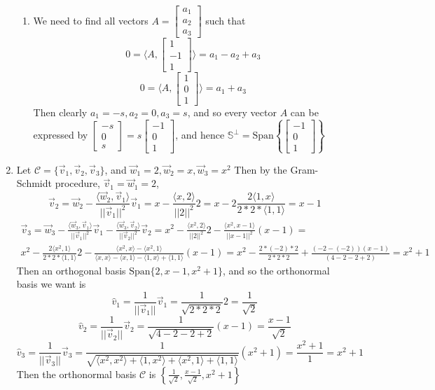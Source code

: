 \documentclass[10pt,english]{article}
\begin{document}
\begin{enumerate}
\begin{enumerate}
    \item We need to find all vectors $A=\begin{bmatrix}a_1\\a_2\\a_3\end{bmatrix}$ such that $$0=\langle A,\begin{bmatrix}1\\-1\\1\end{bmatrix}\rangle=a_1-a_2+a_3$$ $$0=\langle A,\begin{bmatrix}1\\0\\1\end{bmatrix}\rangle=a_1+a_3$$ Then clearly $a_1=-s,a_2=0,a_3=s$, and so every vector $A$ can be expressed by $\begin{bmatrix}-s\\0\\s\end{bmatrix}=s\begin{bmatrix}-1\\0\\1\end{bmatrix}$, and hence $\mathbb{S}^\perp=\text{Span}\left\{\begin{bmatrix}-1\\0\\1\end{bmatrix}\right\}$
\end{enumerate}
\pagebreak
\item Let $\mathcal{C}=\{\vec{v}_1,\vec{v}_2,\vec{v}_3\}$, and $\vec{w}_1=2,\vec{w}_2=x,\vec{w}_3=x^2$ Then by the Gram-Schmidt procedure, $\vec{v}_1=\vec{w}_1=2$, $$\vec{v}_2=\vec{w}_2-\frac{\langle\vec{w}_2,\vec{v}_1\rangle}{||\vec{v}_1||^2}\vec{v}_1=x-\frac{\langle x,2\rangle}{||2||^2}2=x-2\frac{2\langle 1,x\rangle}{2*2*\langle 1,1\rangle}=x-1$$ \begin{multline*}\vec{v}_3=\vec{w}_3-\frac{\langle\vec{w}_3,\vec{v}_1\rangle}{||\vec{v}_1||^2}\vec{v}_1-\frac{\langle\vec{w}_3,\vec{v}_2\rangle}{||\vec{v}_2||^2}\vec{v}_2=x^2-\frac{\langle x^2,2\rangle}{||2||^2}2-\frac{\langle x^2,x-1\rangle}{||x-1||^2}(x-1)=\\x^2-\frac{2\langle x^2,1\rangle}{2*2*\langle 1,1\rangle}2-\frac{\langle x^2,x\rangle-\langle x^2,1\rangle}{\langle x,x\rangle-\langle x,1\rangle-\langle1,x\rangle+\langle1,1\rangle}(x-1)=x^2-\frac{2*(-2)*2}{2*2*2}+\frac{(-2-(-2))(x-1)}{(4-2-2+2)}=x^2+1\end{multline*} Then an orthogonal basis $\text{Span}\{2,x-1,x^2+1\}$, and so the orthonormal basis we want is $$\hat{v}_1=\frac{1}{||\vec{v}_1||}\vec{v}_1=\frac{1}{\sqrt{2*2*2}}2=\frac{1}{\sqrt{2}}$$ $$\hat{v}_2=\frac{1}{||\vec{v}_2||}\vec{v}_2=\frac{1}{\sqrt{4-2-2+2}}(x-1)=\frac{x-1}{\sqrt{2}}$$ $$\hat{v}_3=\frac{1}{||\vec{v}_3||}\vec{v}_3=\frac{1}{\sqrt{\langle x^2,x^2\rangle+\langle 1,x^2\rangle+\langle x^2,1\rangle+\langle 1,1\rangle}}(x^2+1)=\frac{x^2+1}{1}=x^2+1$$ Then the orthonormal basis $\mathcal{C}$ is $\left\{\frac{1}{\sqrt{2}},\frac{x-1}{\sqrt{2}},x^2+1\right\}$


\end{enumerate}
\end{document}
